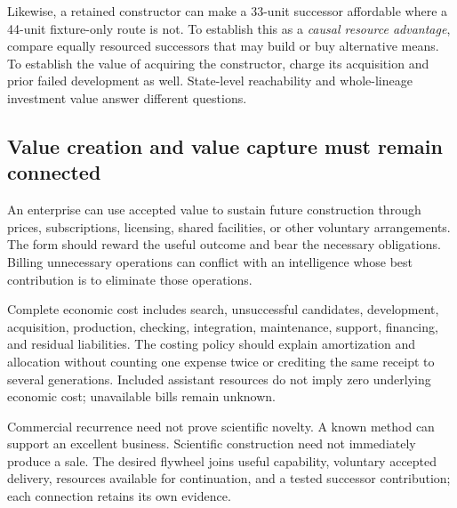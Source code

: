 Likewise, a retained constructor can make a 33-unit successor affordable where a 44-unit fixture-only route is not. To establish this as a \emph{causal resource advantage}, compare equally resourced successors that may build or buy alternative means. To establish the value of acquiring the constructor, charge its acquisition and prior failed development as well. State-level reachability and whole-lineage investment value answer different questions.

\subsection{Value creation and value capture must remain connected}

An enterprise can use accepted value to sustain future construction through prices, subscriptions, licensing, shared facilities, or other voluntary arrangements. The form should reward the useful outcome and bear the necessary obligations. Billing unnecessary operations can conflict with an intelligence whose best contribution is to eliminate those operations.

Complete economic cost includes search, unsuccessful candidates, development, acquisition, production, checking, integration, maintenance, support, financing, and residual liabilities. The costing policy should explain amortization and allocation without counting one expense twice or crediting the same receipt to several generations. Included assistant resources do not imply zero underlying economic cost; unavailable bills remain unknown.

Commercial recurrence need not prove scientific novelty. A known method can support an excellent business. Scientific construction need not immediately produce a sale. The desired flywheel joins useful capability, voluntary accepted delivery, resources available for continuation, and a tested successor contribution; each connection retains its own evidence.
